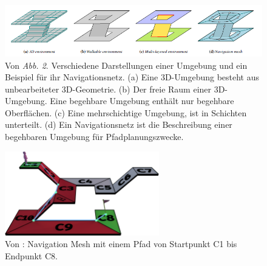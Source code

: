 \begin{figure}[H] %
	\centering
	\includegraphics[width=\textwidth]{images/navigation_mesh_16.png}
	\caption{Von \cite[~S. 93]{Mesh:16} \textit{Abb. 2}. Verschiedene Darstellungen einer Umgebung und ein Beispiel für ihr Navigationsnetz. (a) Eine 3D-Umgebung besteht aus unbearbeiteter 3D-Geometrie. (b) Der freie Raum einer 3D-Umgebung. Eine begehbare Umgebung enthält nur begehbare Oberflächen. (c) Eine mehrschichtige Umgebung, ist in Schichten unterteilt. (d) Ein Navigationsnetz ist die Beschreibung einer begehbaren Umgebung für Pfadplanungszwecke.}
	\label{sec1a}
\end{figure}
\begin{figure}[H] %
	\centering
	\includegraphics[width=0.6\textwidth]{images/mesh_with_path.png}
	\caption{Von \cite{Mesh:18}: Navigation Mesh mit einem Pfad von Startpunkt C1 bis Endpunkt C8.}
	\label{sec1b}
\end{figure}


